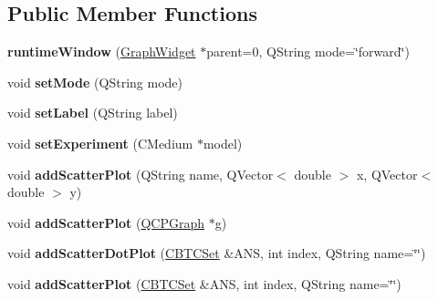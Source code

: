 \subsection*{Public Member Functions}
\begin{DoxyCompactItemize}
\item 
\mbox{\label{classruntime_window_a43b4c0138bce0e7ff0c9d7db3ffd9d97}} 
{\bfseries runtime\+Window} (\hyperlink{class_graph_widget}{Graph\+Widget} $\ast$parent=0, Q\+String mode=\char`\"{}forward\char`\"{})
\item 
\mbox{\label{classruntime_window_a5380a3cbefdff62fd55198635cb102cb}} 
void {\bfseries set\+Mode} (Q\+String mode)
\item 
\mbox{\label{classruntime_window_aa7fb86fde0468b610c4cd6f69cc1ba23}} 
void {\bfseries set\+Label} (Q\+String label)
\item 
\mbox{\label{classruntime_window_a1763b4b0039ef97a043cb4524703975d}} 
void {\bfseries set\+Experiment} (C\+Medium $\ast$model)
\item 
\mbox{\label{classruntime_window_a8825fbf633f8b13c122ec67748d82780}} 
void {\bfseries add\+Scatter\+Plot} (Q\+String name, Q\+Vector$<$ double $>$ x, Q\+Vector$<$ double $>$ y)
\item 
\mbox{\label{classruntime_window_aa46afcbd8b02c8ff337ee3d4db5c343c}} 
void {\bfseries add\+Scatter\+Plot} (\hyperlink{class_q_c_p_graph}{Q\+C\+P\+Graph} $\ast$g)
\item 
\mbox{\label{classruntime_window_a3c07f134bb42c9bf31ff2fb81504a5f4}} 
void {\bfseries add\+Scatter\+Dot\+Plot} (\hyperlink{class_c_b_t_c_set}{C\+B\+T\+C\+Set} \&A\+NS, int index, Q\+String name=\char`\"{}\char`\"{})
\item 
\mbox{\label{classruntime_window_a1265b2b9b22a2bb103e353cb1de1b2a8}} 
void {\bfseries add\+Scatter\+Plot} (\hyperlink{class_c_b_t_c_set}{C\+B\+T\+C\+Set} \&A\+NS, int index, Q\+String name=\char`\"{}\char`\"{})
\item 
\mbox{\label{classruntime_window_a6ffe6077993230969a3b36e0ee9dcedb}} 

\end{DoxyCompactItemize}
